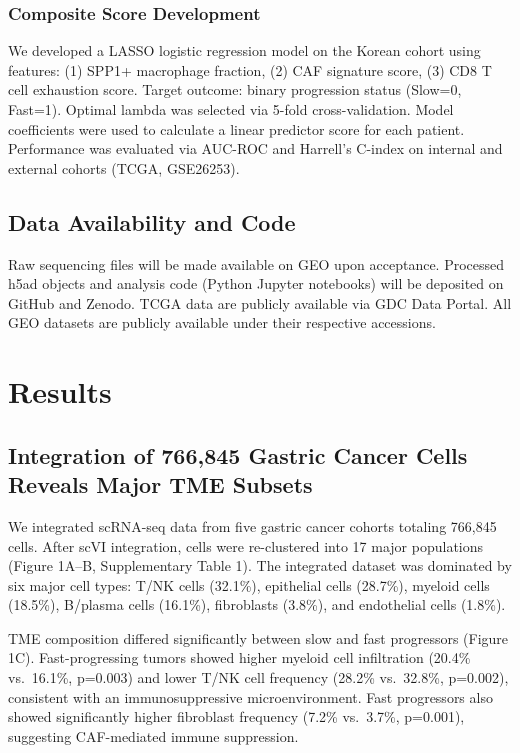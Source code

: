 \documentclass[12pt,twoside]{article}
\begin{document}
\subsubsection{Composite Score Development}
We developed a LASSO logistic regression model on the Korean cohort using features: (1) SPP1+ macrophage fraction, (2) CAF signature score, (3) CD8 T cell exhaustion score. Target outcome: binary progression status (Slow=0, Fast=1). Optimal lambda was selected via 5-fold cross-validation. Model coefficients were used to calculate a linear predictor score for each patient. Performance was evaluated via AUC-ROC and Harrell's C-index on internal and external cohorts (TCGA, GSE26253).

\subsection{Data Availability and Code}

Raw sequencing files will be made available on GEO upon acceptance. Processed h5ad objects and analysis code (Python Jupyter notebooks) will be deposited on GitHub and Zenodo. TCGA data are publicly available via GDC Data Portal. All GEO datasets are publicly available under their respective accessions.


\section{Results}

\subsection{Integration of 766,845 Gastric Cancer Cells Reveals Major TME Subsets}

We integrated scRNA-seq data from five gastric cancer cohorts totaling 766,845 cells. After scVI integration, cells were re-clustered into 17 major populations (Figure 1A--B, Supplementary Table 1). The integrated dataset was dominated by six major cell types: T/NK cells (32.1\%), epithelial cells (28.7\%), myeloid cells (18.5\%), B/plasma cells (16.1\%), fibroblasts (3.8\%), and endothelial cells (1.8\%).

TME composition differed significantly between slow and fast progressors (Figure 1C). Fast-progressing tumors showed higher myeloid cell infiltration (20.4\% vs.\ 16.1\%, p=0.003) and lower T/NK cell frequency (28.2\% vs.\ 32.8\%, p=0.002), consistent with an immunosuppressive microenvironment. Fast progressors also showed significantly higher fibroblast frequency (7.2\% vs.\ 3.7\%, p=0.001), suggesting CAF-mediated immune suppression.
\end{document}
